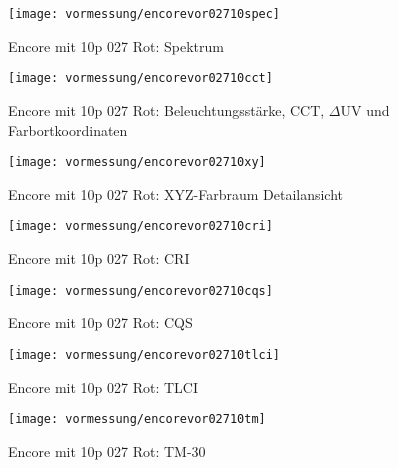 \documentclass[pagesize,paper=A4,fontsize=12pt,utf8,numbers=noenddot,bibliography=totoc,listof=totoc,DIV=11,BCOR=1mm]{scrreprt}
\begin{document}
\begin{figure}[htp]     %
\centering
\texttt{[image: vormessung/encorevor02710spec]} 
\caption {Encore mit 10p 027 Rot: Spektrum} 
\end{figure}

\begin{figure}[htp]     %
\centering
\texttt{[image: vormessung/encorevor02710cct]} 
\caption {Encore mit 10p 027 Rot: Beleuchtungsstärke, CCT, $\Delta$UV und Farbortkoordinaten} 
\end{figure}

\begin{figure}[htp]     %
\centering
\texttt{[image: vormessung/encorevor02710xy]} 
\caption {Encore mit 10p 027 Rot: XYZ-Farbraum Detailansicht} 
\end{figure}

\begin{figure}[htp]     %
\centering
\texttt{[image: vormessung/encorevor02710cri]} 
\caption {Encore mit 10p 027 Rot: CRI} 
\end{figure}

\begin{figure}[htp]     %
\centering
\texttt{[image: vormessung/encorevor02710cqs]} 
\caption {Encore mit 10p 027 Rot: CQS} 
\end{figure}

\begin{figure}[htp]     %
\centering
\texttt{[image: vormessung/encorevor02710tlci]} 
\caption {Encore mit 10p 027 Rot: TLCI} 
\end{figure}

\begin{figure}[htp]     %
\centering
\texttt{[image: vormessung/encorevor02710tm]} 
\caption {Encore mit 10p 027 Rot: TM-30} 
\end{figure}
\end{document}
